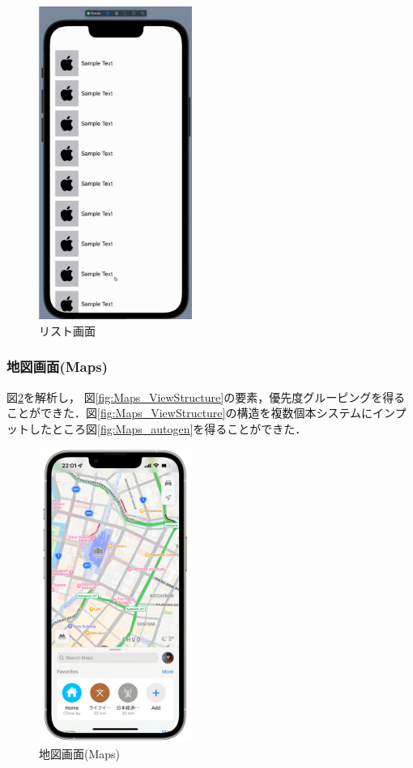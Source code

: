 \begin{figure}[htbp]
  \begin{minipage}{\hsize}
    \begin{center}
       \includegraphics[width=50mm]{img/Settings_autogen.png}
    \end{center}
    \caption{リスト画面}
    \label{fig:Settings_autogen}
  \end{minipage}
\end{figure}


\subsubsection{地図画面(Maps)}
図\ref{fig:Maps_screenshot}を解析し， 図\ref{fig:Maps_ViewStructure}の要素，優先度グルーピングを得ることができた．図\ref{fig:Maps_ViewStructure}の構造を複数個本システムにインプットしたところ図\ref{fig:Maps_autogen}を得ることができた．


\begin{figure}[htbp]
  \begin{minipage}{\hsize}
    \begin{center}
       \includegraphics[width=50mm]{img/Maps_screenshot.png}
    \end{center}
    \caption{地図画面(Maps)}
    \label{fig:Maps_screenshot}
  \end{minipage}
\end{figure}

